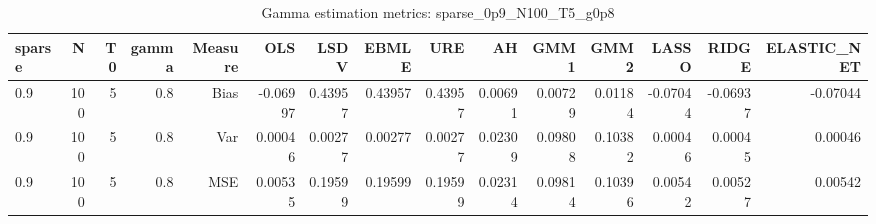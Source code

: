 \begin{table}[!htbp]\centering
\caption{Gamma estimation metrics: sparse_0p9_N100_T5_g0p8}
\label{tab:table1_sparse_0p9_N100_T5_g0p8}
\begin{tabular}{lrrrrrrrrrrrrrr}
\hline
sparse & N & T0 & gamma & Measure & OLS & LSDV & EBMLE & URE & AH & GMM1 & GMM2 & LASSO & RIDGE & ELASTIC_NET \\
\hline
0.9 & 100 & 5 & 0.8 & Bias & -0.06997 & 0.43957 & 0.43957 & 0.43957 & 0.00691 & 0.00729 & 0.01184 & -0.07044 & -0.06937 & -0.07044 \\
0.9 & 100 & 5 & 0.8 & Var & 0.00046 & 0.00277 & 0.00277 & 0.00277 & 0.02309 & 0.09808 & 0.10382 & 0.00046 & 0.00045 & 0.00046 \\
0.9 & 100 & 5 & 0.8 & MSE & 0.00535 & 0.19599 & 0.19599 & 0.19599 & 0.02314 & 0.09814 & 0.10396 & 0.00542 & 0.00527 & 0.00542 \\
\hline
\end{tabular}
\end{table}

